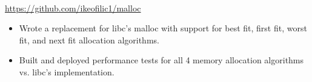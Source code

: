 \\
{\url{https://github.com/ikeofilic1/malloc}}
\begin{itemize}
    \item Wrote a replacement for libc's malloc with support for best fit, first fit, worst fit, and next fit allocation algorithms.
    \item Built and deployed performance tests for all 4 memory allocation algorithms vs. libc's implementation.
\end{itemize}